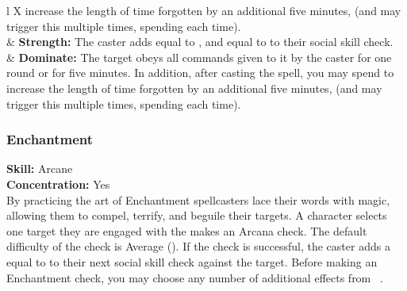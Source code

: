 \begin{table*}[!htb]
\begin{GenesysTable}{l X}
                            increase the length of time forgotten by an additional
                            five minutes, (and may trigger this multiple times,
                            spending \advantage each time).\\
\difficulty\difficulty  & \textbf{Strength:} The caster adds \success equal to \success,
                            and \advantage equal to \advantage to their social
                            skill check.\\
\difficulty\difficulty  & \textbf{Dominate:} The target obeys all commands given to it by
                            the caster for one round or for five minutes. In
                            addition, after casting the spell, you may spend \advantage
                            to increase the length of time forgotten by an
                            additional five minutes, (and may trigger this
                            multiple times, spending \advantage each time).\\
\end{GenesysTable}
\label{table:magic_enchantment}
\end{table*}

\subsubsection{Enchantment}
\textbf{Skill:} Arcane\\
\textbf{Concentration:} Yes\\
By practicing the art of Enchantment spellcasters lace their words with magic,
allowing them to compel, terrify, and beguile their targets. A character selects
one target they are engaged with the makes an Arcana check.  The default
difficulty of the check is Average (\difficulty\difficulty). If the check is
successful, the caster adds a equal to \advantage to their next social skill
check against the target. Before making an Enchantment check, you may choose
any number of additional effects from ~.
